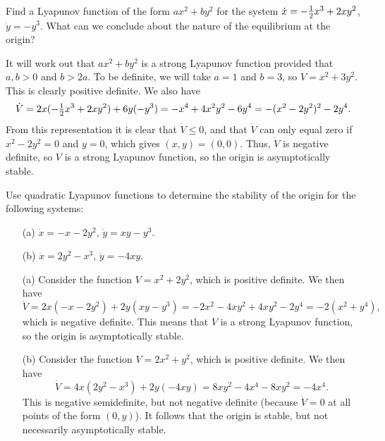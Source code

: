 \documentclass[a4paper]{amsart}
\begin{document}
\begin{exercise}\label{ex-lyapunov-f}
 Find a Lyapunov function of the form $ax^2+by^2$ for the system
 $\dot{x}=-\tfrac{1}{2} x^3+2xy^2$, $\dot{y}=-y^3$.  What can we conclude
 about the nature of the equilibrium at the origin?
\end{exercise}
\begin{solution}
 It will work out that $ax^2+by^2$ is a strong Lyapunov function
 provided that $a,b>0$ and $b>2a$.  To be definite, we will take $a=1$
 and $b=3$, so $V=x^2+3y^2$.  This is clearly positive definite.  We
 also have 
 \[ \dot{V} = 2x(-\tfrac{1}{2} x^3+2xy^2) +6y(-y^3)
            = -x^4 +4x^2y^2-6y^4
            = -(x^2-2y^2)^2 -2y^4.
 \]
 From this representation it is clear that $\dot{V}\leq 0$, and that
 $\dot{V}$ can only equal zero if $x^2-2y^2=0$ and $y=0$, which gives
 $(x,y)=(0,0)$.  Thus, $\dot{V}$ is negative definite, so $V$ is a
 strong Lyapunov function, so the origin is asymptotically stable.
\end{solution}

\begin{exercise}\label{ex-lyapunov-g}
 Use quadratic Lyapunov functions to determine the stability of the
 origin for the following systems:
 \begin{itemize}
  \item[(a)] $\dot{x}=-x-2y^2$,\; $\dot{y}=xy-y^3$.
  \item[(b)] $\dot{x}=2y^2-x^3$,\; $\dot{y}=-4xy$.
 \end{itemize}
\end{exercise}
\begin{solution}\leavevmode
 \begin{itemize}
  \item[(a)] Consider the function $V=x^2+2y^2$, which is positive
   definite.  We then have 
   \[ \dot{V} = 2x(-x-2y^2) + 2y(xy-y^3) 
              = -2x^2 -4xy^2 + 4xy^2 - 2y^4 
              = -2(x^2+y^4), 
   \]
   which is negative definite.  This means that $V$ is a strong
   Lyapunov function, so the origin is asymptotically stable.
  \item[(b)] Consider the function $V=2x^2+y^2$, which is positive
   definite.  We then have 
   \[ \dot{V} = 4x(2y^2-x^3) +2y(-4xy) 
              = 8xy^2 - 4x^4 - 8xy^2 = -4x^4.
   \]
   This is negative semidefinite, but not negative definite (because
   $\dot{V}=0$ at all points of the form $(0,y)$).  It follows that
   the origin is stable, but not necessarily asymptotically stable.
 \end{itemize}
\end{solution}
\end{document}
